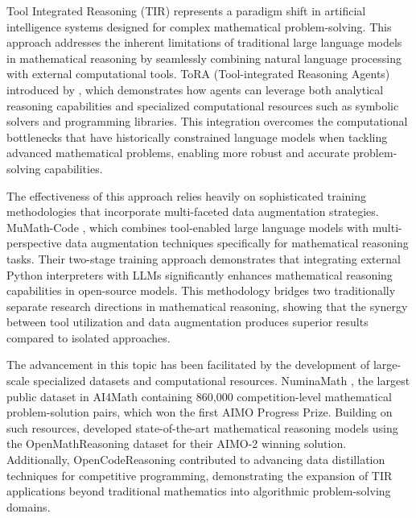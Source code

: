 

Tool Integrated Reasoning (TIR) represents a paradigm shift in artificial intelligence systems designed for complex mathematical problem-solving. This approach addresses the inherent limitations of traditional large language models in mathematical reasoning by seamlessly combining natural language processing with external computational tools. ToRA (Tool-integrated Reasoning Agents) introduced by \citep{Gou2024ToRA}, which demonstrates how agents can leverage both analytical reasoning capabilities and specialized computational resources such as symbolic solvers and programming libraries. This integration overcomes the computational bottlenecks that have historically constrained language models when tackling advanced mathematical problems, enabling more robust and accurate problem-solving capabilities.

The effectiveness of this approach relies heavily on sophisticated training methodologies that incorporate multi-faceted data augmentation strategies.  MuMath-Code \citep{Yin2024MuMathCode}, which combines tool-enabled large language models with multi-perspective data augmentation techniques specifically for mathematical reasoning tasks. Their two-stage training approach demonstrates that integrating external Python interpreters with LLMs significantly enhances mathematical reasoning capabilities in open-source models. This methodology bridges two traditionally separate research directions in mathematical reasoning, showing that the synergy between tool utilization and data augmentation produces superior results compared to isolated approaches.

The advancement in this topic has been facilitated by the development of large-scale specialized datasets and computational resources. NuminaMath \citep{Li2024NuminaMath}, the largest public dataset in AI4Math containing 860,000 competition-level mathematical problem-solution pairs, which won the first AIMO Progress Prize. Building on such resources, \citep{Moshkov2025AIMO2} developed state-of-the-art mathematical reasoning models using the OpenMathReasoning dataset for their AIMO-2 winning solution. Additionally,  OpenCodeReasoning \citep{Ahmad2025OCRNVidia} contributed to advancing data distillation techniques for competitive programming, demonstrating the expansion of TIR applications beyond traditional mathematics into algorithmic problem-solving domains.

